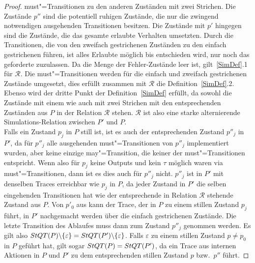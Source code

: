 \begin{proof}
  must"=Transitionen zu den anderen Zuständen mit zwei Strichen. Die Zustände
  $p''$ sind die potentiell ruhigen Zustände, die nur die zwingend notwendigen
  ausgehenden Transitionen besitzen. Die Zustände mit $p'$ hingegen sind die
  Zustände, die das gesamte erlaubte Verhalten umsetzten. Durch die
  Transitionen, die von den zweifach gestrichenen Zuständen zu den einfach
  gestrichenen führen, ist alles Erlaubte möglich bis entschieden wird, nur
  noch das geforderte zuzulassen. Da die Menge der Fehler-Zustände leer ist,
  gilt~\ref{SimDef}.1 für $\mathcal{R}$. Die must"=Transitionen werden für die
  einfach und zweifach gestrichenen Zustände umgesetzt, dies erfüllt zusammen
  mit $\mathcal{R}$ die Definition~\ref{SimDef}.2. Ebenso wird der dritte Punkt
  der Definition~\ref{SimDef} erfüllt, da sowohl die Zustände mit einem wie
  auch mit zwei Strichen mit den entsprechenden Zuständen aus $P$ in der
  Relation $\mathcal{R}$ stehen. $\mathcal{R}$ ist also eine starke
  alternierende Simulations-Relation zwischen $P'$ und $P$.\\
  Falls ein Zustand $p_j$ in $P$ still ist, ist es auch der entsprechenden
  Zustand $p''_j$ in $P'$, da für $p''_j$ alle ausgehenden must"=Transitionen
  von $p''_j$ implementiert wurden, aber keine einzige may"=Transition, die
  keiner der must"=Transitionen entspricht. Wenn also für $p_j$ keine Outputs
  und kein $\tau$ möglich waren via must"=Transitionen, dann ist es dies auch
  für $p''_j$ nicht. $p''_j$ ist in $P'$ mit denselben Traces erreichbar wie
  $p_j$ in $P$, da jeder Zustand in $P'$ die selben eingehenden Transitionen
  hat wie der entsprechende in Relation $\mathcal{R}$ stehende Zustand aus $P$.
  Von $p'_0$ aus kann der Trace, der in $P$ zu einem stillen Zustand $p_j$
  führt, in $P'$ nachgemacht werden über die einfach gestrichenen Zustände. Die
  letzte Transition des Ablaufes muss dann zum Zustand $p''_j$ genommen werden.
  Es gilt also $StQT (P)\backslash \{\varepsilon\} = StQT (P')\backslash
  \{\varepsilon\}$. Falls $\varepsilon$ zu einem stillen Zustand $p \neq p_0$
  in $P$ geführt hat, gilt sogar $StQT(P) = StQT (P')$, da ein Trace aus
  internen Aktionen in $P$ und $P'$ zu dem entsprechenden stillen Zustand $p$
  bzw.\ $p''$ führt.


\end{proof}
